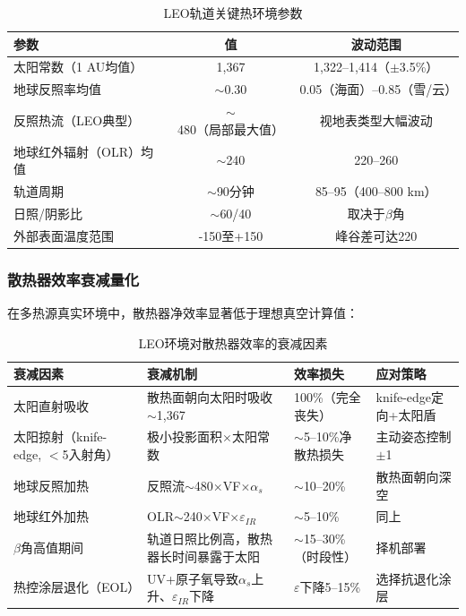 \begin{table}[H]
\centering
\footnotesize
\caption{LEO轨道关键热环境参数}
\label{tab:leo_thermal}
\begin{tabular}{lcc}
\toprule
\textbf{参数} & \textbf{值} & \textbf{波动范围} \\
\midrule
太阳常数（1 AU均值） & 1,367\unitWpm{} & 1,322--1,414（$\pm$3.5\%） \\
地球反照率均值 & $\sim$0.30 & 0.05（海面）--0.85（雪/云） \\
反照热流（LEO典型） & $\sim$480\unitWpm{}（局部最大值） & 视地表类型大幅波动 \\
地球红外辐射（OLR）均值 & $\sim$240\unitWpm{} & 220--260 \\
轨道周期 & $\sim$90分钟 & 85--95（400--800 km） \\
日照/阴影比 & $\sim$60/40 & 取决于$\beta$角 \\
外部表面温度范围 & -150\unitC{}至+150\unitC{} & 峰谷差可达220\unitC{} \\
\bottomrule
\end{tabular}
\end{table}

\subsubsection{散热器效率衰减量化}

在多热源真实环境中，散热器净效率显著低于理想真空计算值\cite{modus2026thermal,encyclopedia2025leo}：

\begin{table}[H]
\centering
\footnotesize
\caption{LEO环境对散热器效率的衰减因素}
\label{tab:efficiency_loss}
\begin{tabular}{p{2.8cm}p{5.2cm}p{1.8cm}p{2.8cm}}
\toprule
\textbf{衰减因素} & \textbf{衰减机制} & \textbf{效率损失} & \textbf{应对策略} \\
\midrule
太阳直射吸收 & 散热面朝向太阳时吸收$\sim$1,367\unitWpm{} & 100\%（完全丧失） & knife-edge定向+太阳盾 \\
\hline
太阳掠射（knife-edge, $<$5\unitC{}入射角） & 极小投影面积$\times$太阳常数 & $\sim$5--10\%净散热损失 & 主动姿态控制$\pm$1\unitC{} \\
\hline
地球反照加热 & 反照流$\sim$480\unitWpm{}$\times$VF$\times\alpha_s$ & $\sim$10--20\% & 散热面朝向深空 \\
\hline
地球红外加热 & OLR$\sim$240\unitWpm{}$\times$VF$\times\varepsilon_{IR}$ & $\sim$5--10\% & 同上 \\
\hline
$\beta$角高值期间 & 轨道日照比例高，散热器长时间暴露于太阳 & $\sim$15--30\%（时段性） & 择机部署 \\
\hline
热控涂层退化（EOL） & UV+原子氧导致$\alpha_s$上升、$\varepsilon_{IR}$下降 & $\varepsilon$下降5--15\% & 选择抗退化涂层 \\
\bottomrule
\end{tabular}
\end{table}

